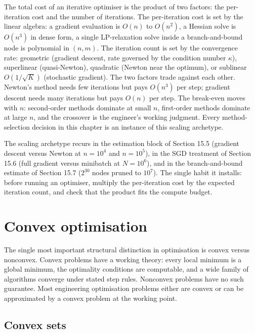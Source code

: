 \begin{archetype}
The total cost of an iterative optimiser is the product of two
factors: the per-iteration cost and the number of iterations.
The per-iteration cost is set by the linear algebra: a
gradient evaluation is $O(n)$ to $O(n^{2})$, a Hessian solve is
$O(n^{3})$ in dense form, a single LP-relaxation solve inside a
branch-and-bound node is polynomial in $(n, m)$. The iteration
count is set by the convergence rate: geometric (gradient descent,
rate governed by the condition number $\kappa$), superlinear
(quasi-Newton), quadratic (Newton near the optimum), or
sublinear $O(1/\sqrt{K})$ (stochastic gradient). The two factors
trade against each other. Newton's method needs few iterations
but pays $O(n^{3})$ per step; gradient descent needs many
iterations but pays $O(n)$ per step. The break-even moves with
$n$: second-order methods dominate at small $n$, first-order
methods dominate at large $n$, and the crossover is the
engineer's working judgment. Every method-selection decision in
this chapter is an instance of this scaling archetype.
\end{archetype}

The scaling archetype recurs in the estimation block of
Section 15.5 (gradient descent versus Newton at $n = 10^{4}$ and
$n = 10^{5}$), in the SGD treatment of Section 15.6 (full gradient
versus minibatch at $N = 10^{6}$), and in the branch-and-bound
estimate of Section 15.7 ($2^{30}$ nodes pruned to $10^{7}$). The
single habit it installs: before running an optimiser, multiply
the per-iteration cost by the expected iteration count, and check
that the product fits the compute budget.

\section{Convex optimisation}

The single most important structural distinction in optimisation
is convex versus nonconvex. Convex problems have a working
theory: every local minimum is a global minimum, the optimality
conditions are computable, and a wide family of algorithms
converge under stated step rules. Nonconvex problems have no
such guarantee. Most engineering optimisation problems either
are convex or can be approximated by a convex problem at the
working point.

\subsection{Convex sets}

